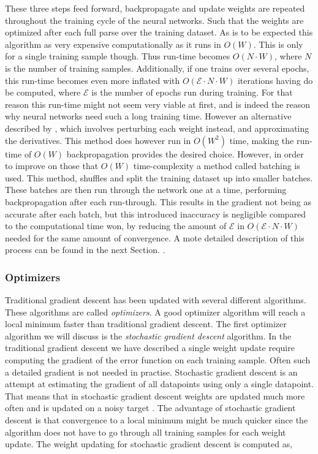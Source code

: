 These three steps feed forward, backpropagate and update weights are repeated
throughout the training cycle of the neural networks. Such that the weights
are optimized after each full parse over the training dataset. As is to be
expected this algorithm as very expensive computationally as it runs in $O(W)$.
This is only for a single training sample though. Thus run-time becomes $O(N
\cdot W)$, where $N$ is the number of training samples. Additionally, if
one trains over several epochs, this run-time becomes even more inflated
with $O(\mathcal{E}\cdot N\cdot W)$ iterations having do be computed, where
$\mathcal{E}$ is the number of epochs run during training. For that reason
this run-time might not seem very viable at first, and is indeed the reason
why neural networks need such a long training time. However an alternative
described by \citet{Bishop}, which involves perturbing each weight instead, and
approximating the derivatives. This method does however run in $O(W^2)$ time,
making the run-time of $O(W)$ backpropagation provides the desired choice.
However, in order to improve on those that $O(W)$ time-complexity a method
called batching is used. This method, shuffles and split the training dataset
up into smaller batches. These batches are then run through the network one at
a time, performing backpropagation after each run-through. This results in the
gradient not being as accurate after each batch, but this introduced inaccuracy
is negligible compared to the computational time won, by reducing the amount of
$\mathcal{E}$ in $O(\mathcal{E}\cdot N\cdot W)$ needed for the same amount of
convergence. A mote detailed description of this process can be found in the
next Section. \citep{Bishop}.


\subsubsection{Optimizers}\label{sec:optimizers}

Traditional gradient descent has been updated with several different algorithms.
These algorithms are called \textit{optimizers}. A good optimizer algorithm
will reach a local minimum faster than traditional gradient descent. The first
optimizer algorithm we will discuss is the \textit{stochastic gradient descent}
algorithm. In the traditional gradient descent we have described a single
weight update require computing the gradient of the error function on each
training sample. Often such a detailed gradient is not needed in practise.
Stochastic gradient descent is an attempt at estimating the gradient of all
datapoints using only a single datapoint. That means that in stochastic gradient
descent weights are updated much more often and is updated on a noisy target
\citep{Bishop}. The advantage of stochastic gradient descent is that convergence
to a local minimum might be much quicker since the algorithm does not have to
go through all training samples for each weight update. The weight updating for
stochastic gradient descent is computed as,

